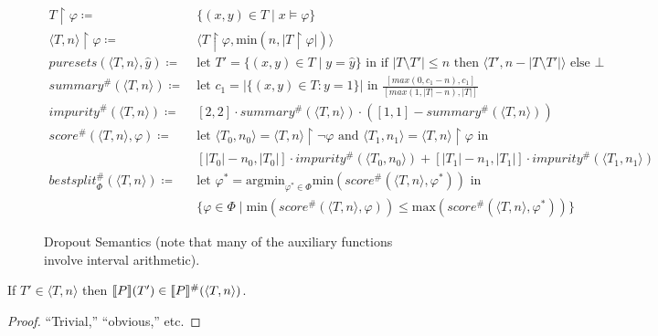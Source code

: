 \begin{figure}
\begin{align*}
%
T \upharpoonright \varphi \coloneqq&~ \{(x,y) \in T \mid x \models \varphi\} \\
%
\langle T, n \rangle \upharpoonright \varphi \coloneqq&~
\langle T \upharpoonright \varphi, \text{min}(n, |T \upharpoonright \varphi|) \rangle \\
%
\mathit{puresets}(\langle T, n\rangle, \hat{y}) \coloneqq&~
\text{let } T' = \{(x,y) \in T \mid y = \hat{y}\} \text{ in }
\text{if } |T \setminus T'| \leq n \text{ then } \langle T', n - |T \setminus T'| \rangle
\text{ else } \bot \\
%
\mathit{summary}^\#(\langle T, n \rangle) \coloneqq&~
\text{let } c_1 = |\{(x,y) \in T : y = 1\}| \text{ in }
\frac{[max(0, c_1 - n), c_1]}{[max(1, |T| - n), |T|]}\\
%
\mathit{impurity}^\#(\langle T, n \rangle) \coloneqq&~
[2,2] \cdot \mathit{summary^\#(\langle T, n \rangle)}
\cdot ([1,1] - summary^\#(\langle T, n \rangle)) \\
%
\mathit{score}^\#(\langle T, n \rangle, \varphi) \coloneqq&~
\text{let } \langle T_0, n_0 \rangle = \langle T, n \rangle \upharpoonright \lnot \varphi
\text{ and } \langle T_1, n_1 \rangle = \langle T, n \rangle \upharpoonright \varphi \text{ in } \\
&~[|T_0| - n_0, |T_0|] \cdot \mathit{impurity}^\#(\langle T_0, n_0 \rangle) +
[|T_1| - n_1, |T_1|] \cdot \mathit{impurity}^\#(\langle T_1, n_1 \rangle)\\
%
\mathit{bestsplit}^\#_\Phi(\langle T, n \rangle) \coloneqq&~
\text{let } \varphi^* = \text{argmin}_{\varphi^* \in \Phi} \text{min}(\mathit{score}^\#(\langle T, n \rangle, \varphi^*)) \text{ in } \\
&~ \{\varphi \in \Phi \mid \text{min}(\mathit{score}^\#(\langle T, n \rangle, \varphi)) \leq \text{max}(\mathit{score}^\#(\langle T, n \rangle, \varphi^*))\}
\end{align*}
\caption{Dropout Semantics (note that many of the auxiliary functions involve interval arithmetic).}
\label{fig:abstract}
\end{figure}

\begin{theorem}[Soundness]
If $T' \in \langle T, n \rangle$ then $\llbracket {P} \rrbracket(T') \in \llbracket {P} \rrbracket^\#(\langle T, n \rangle)$.
\end{theorem}
\begin{proof}
``Trivial,'' ``obvious,'' etc.
\end{proof}
